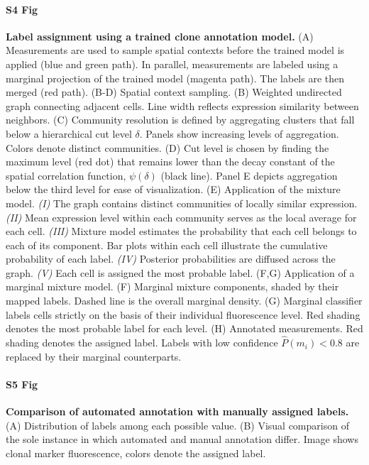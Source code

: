 \documentclass[10pt,letterpaper]{article}
\begin{document}
\paragraph*{S4 Fig} 
\label{S4_Fig} 
{\bf Label assignment using a trained clone annotation model.} (A) Measurements are used to sample spatial contexts before the trained model is applied (blue and green path). In parallel, measurements are labeled using a marginal projection of the trained model (magenta path). The labels are then merged (red path). (B-D) Spatial context sampling. (B) Weighted undirected graph connecting adjacent cells. Line width reflects expression similarity between neighbors. (C) Community resolution is defined by aggregating clusters that fall below a hierarchical cut level $\delta$. Panels show increasing levels of aggregation. Colors denote distinct communities. (D) Cut level is chosen by finding the maximum level (red dot) that remains lower than the decay constant of the spatial correlation function, $\psi(\delta)$ (black line). Panel E depicts aggregation below the third level for ease of visualization. (E) Application of the mixture model. \emph{(I)} The graph contains distinct communities of locally similar expression. \emph{(II)} Mean expression level within each community serves as the local average for each cell. \emph{(III)} Mixture model estimates the probability that each cell belongs to each of its component. Bar plots within each cell illustrate the cumulative probability of each label. \emph{(IV)} Posterior probabilities are diffused across the graph. \emph{(V)} Each cell is assigned the most probable label. (F,G) Application of a marginal mixture model. (F) Marginal mixture components, shaded by their mapped labels. Dashed line is the overall marginal density. (G) Marginal classifier labels cells strictly on the basis of their individual fluorescence level. Red shading denotes the most probable label for each level. (H) Annotated measurements. Red shading denotes the assigned label. Labels with low confidence $\hat{P}(m_i)<0.8$ are replaced by their marginal counterparts.

\paragraph*{S5 Fig} 
\label{S5_Fig} 
{\bf Comparison of automated annotation with manually assigned labels.} (A) Distribution of labels among each possible value. (B) Visual comparison of the sole instance in which automated and manual annotation differ. Image shows clonal marker fluorescence, colors denote the assigned label.
\end{document}
